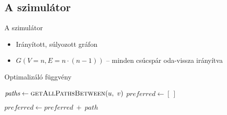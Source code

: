   \subsection{A szimulátor}
  \begin{frame}{A szimulátor}

    \begin{itemize}
      \item<1-> Irányított, súlyozott gráfon
      \item<2-> $G(V=n, E=n \cdot (n-1))$ -- minden csúcspár oda-vissza irányítva
    \end{itemize}
    \begin{algorithm}[H]
      \caption{Optimalizáló függvény}\label{algo_optimalizalo}
      \begin{algorithmic}[1]
          \State $\textit{paths} \gets \Call{getAllPathsBetween}{u,~v}$
          \State $\textit{preferred} \gets [~]$

              \State $\textit{preferred} \gets \textit{preferred}~+~path$
            \EndIf
          \EndFor
        \EndProcedure
      \end{algorithmic}
    \end{algorithm}
  \end{frame}


